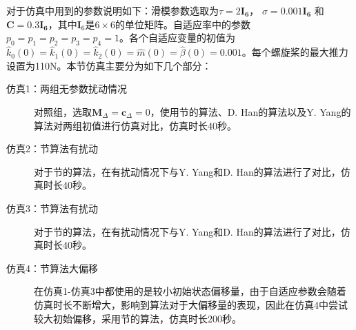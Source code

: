 对于仿真中用到的参数说明如下：滑模参数选取为$\tau=2\mathbf{I_6}$， $\sigma=0.001\mathbf{I_6}$ 和 $\mathbf{C}=0.3\mathbf{I_6}$，其中$\mathbf{I}_6$是$6\times 6$的单位矩阵。自适应率中的参数$p_0=p_1=p_2=p_3=p_4=1$。各个自适应变量的初值为$\hat{k}_0(0)=\hat{k}_1(0)=\hat{k}_2(0)=\hat{m}(0)=\hat{\beta}(0)=0.001$。每个螺旋桨的最大推力设置为110N。本节仿真主要分为如下几个部分：
\begin{description}
    \item[仿真1：两组无参数扰动情况] 对照组，选取$\mathbf{M}_{\Delta}=\mathbf{c}_{\Delta}=0$，使用节的算法、D. Han的算法以及Y. Yang的算法对两组初值进行仿真对比，仿真时长40秒。
    \item[仿真2：节算法有扰动] 对于节的算法，在有扰动情况下与Y. Yang和D. Han的算法进行了对比，仿真时长40秒。
    \item[仿真3：节算法有扰动] 对于节的算法，在有扰动情况下与Y. Yang和D. Han的算法进行了对比，仿真时长40秒。
    \item[仿真4：节算法大偏移] 在仿真1-仿真3中都使用的是较小初始状态偏移量，由于自适应参数会随着仿真时长不断增大，影响到算法对于大偏移量的表现，因此在仿真4中尝试较大初始偏移，采用节的算法，仿真时长200秒。
\end{description}

